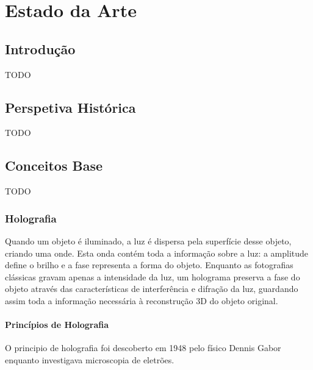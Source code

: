 \chapter{Estado da Arte}
\label{ch::estado-arte}

\section{Introdução}
\label{sec::estado-arte:intro}

TODO


\section{Perspetiva Histórica}
\label{sec::estado-arte:historia}

TODO


\section{Conceitos Base}
\label{sec::estado-arte:conceitos}

TODO

\subsection{Holografia}
\label{ssec::estado-arte:holografia}

Quando um objeto é iluminado, a luz é dispersa pela superfície desse objeto, criando uma onde. Esta onda contém toda a informação sobre a luz: a amplitude define o brilho e a fase representa a forma do objeto. Enquanto as fotografias clássicas gravam apenas a intensidade da luz, um holograma preserva a fase do objeto através das características de interferência e difração da luz, guardando assim toda a informação necessária à reconstrução 3D do objeto original.


\subsubsection{Princípios de Holografia}
\label{sssec::estado-arte:holografia:principios}

O principio de holografia foi descoberto em 1948 pelo físico Dennis Gabor enquanto investigava microscopia de eletrões.

